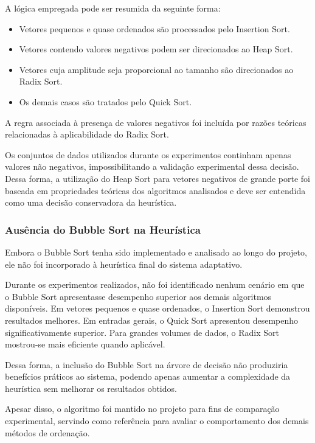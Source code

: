 \documentclass{article}
\begin{document}
A lógica empregada pode ser resumida da seguinte forma:

\begin{itemize}
    \item Vetores pequenos e quase ordenados são processados pelo Insertion Sort.
    \item Vetores contendo valores negativos podem ser direcionados ao Heap Sort.
    \item Vetores cuja amplitude seja proporcional ao tamanho são direcionados ao Radix Sort.
    \item Os demais casos são tratados pelo Quick Sort.
\end{itemize}

A regra associada à presença de valores negativos foi incluída por razões teóricas relacionadas à aplicabilidade do Radix Sort.

Os conjuntos de dados utilizados durante os experimentos continham apenas valores não negativos, impossibilitando a validação experimental dessa decisão. Dessa forma, a utilização do Heap Sort para vetores negativos de grande porte foi baseada em propriedades teóricas dos algoritmos analisados e deve ser entendida como uma decisão conservadora da heurística.

\subsubsection{Ausência do Bubble Sort na Heurística}

Embora o Bubble Sort tenha sido implementado e analisado ao longo do projeto, ele não foi incorporado à heurística final do sistema adaptativo.

Durante os experimentos realizados, não foi identificado nenhum cenário em que o Bubble Sort apresentasse desempenho superior aos demais algoritmos disponíveis. Em vetores pequenos e quase ordenados, o Insertion Sort demonstrou resultados melhores. Em entradas gerais, o Quick Sort apresentou desempenho significativamente superior. Para grandes volumes de dados, o Radix Sort mostrou-se mais eficiente quando aplicável.

Dessa forma, a inclusão do Bubble Sort na árvore de decisão não produziria benefícios práticos ao sistema, podendo apenas aumentar a complexidade da heurística sem melhorar os resultados obtidos.

Apesar disso, o algoritmo foi mantido no projeto para fins de comparação experimental, servindo como referência para avaliar o comportamento dos demais métodos de ordenação.
\end{document}
